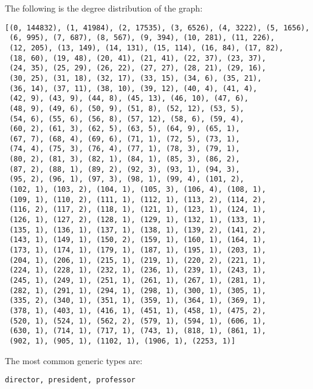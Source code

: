 \documentclass{tufte-handout}
\begin{document}
\begin{enumerate}
The following is the degree distribution of the graph:
\begin{verbatim}
[(0, 144832), (1, 41984), (2, 17535), (3, 6526), (4, 3222), (5, 1656),
 (6, 995), (7, 687), (8, 567), (9, 394), (10, 281), (11, 226),
 (12, 205), (13, 149), (14, 131), (15, 114), (16, 84), (17, 82),
 (18, 60), (19, 48), (20, 41), (21, 41), (22, 37), (23, 37),
 (24, 35), (25, 29), (26, 22), (27, 27), (28, 21), (29, 16),
 (30, 25), (31, 18), (32, 17), (33, 15), (34, 6), (35, 21),
 (36, 14), (37, 11), (38, 10), (39, 12), (40, 4), (41, 4),
 (42, 9), (43, 9), (44, 8), (45, 13), (46, 10), (47, 6),
 (48, 9), (49, 6), (50, 9), (51, 8), (52, 12), (53, 5),
 (54, 6), (55, 6), (56, 8), (57, 12), (58, 6), (59, 4),
 (60, 2), (61, 3), (62, 5), (63, 5), (64, 9), (65, 1),
 (67, 7), (68, 4), (69, 6), (71, 1), (72, 5), (73, 1),
 (74, 4), (75, 3), (76, 4), (77, 1), (78, 3), (79, 1),
 (80, 2), (81, 3), (82, 1), (84, 1), (85, 3), (86, 2),
 (87, 2), (88, 1), (89, 2), (92, 3), (93, 1), (94, 3),
 (95, 2), (96, 1), (97, 3), (98, 1), (99, 4), (101, 2),
 (102, 1), (103, 2), (104, 1), (105, 3), (106, 4), (108, 1),
 (109, 1), (110, 2), (111, 1), (112, 1), (113, 2), (114, 2),
 (116, 2), (117, 2), (118, 1), (121, 1), (123, 1), (124, 1),
 (126, 1), (127, 2), (128, 1), (129, 1), (132, 1), (133, 1),
 (135, 1), (136, 1), (137, 1), (138, 1), (139, 2), (141, 2),
 (143, 1), (149, 1), (150, 2), (159, 1), (160, 1), (164, 1),
 (173, 1), (174, 1), (179, 1), (187, 1), (195, 1), (203, 1),
 (204, 1), (206, 1), (215, 1), (219, 1), (220, 2), (221, 1),
 (224, 1), (228, 1), (232, 1), (236, 1), (239, 1), (243, 1),
 (245, 1), (249, 1), (251, 1), (261, 1), (267, 1), (281, 1),
 (282, 1), (291, 1), (294, 1), (298, 1), (300, 1), (305, 1),
 (335, 2), (340, 1), (351, 1), (359, 1), (364, 1), (369, 1),
 (378, 1), (403, 1), (416, 1), (451, 1), (458, 1), (475, 2),
 (520, 1), (524, 1), (562, 2), (579, 1), (594, 1), (606, 1),
 (630, 1), (714, 1), (717, 1), (743, 1), (818, 1), (861, 1),
 (902, 1), (905, 1), (1102, 1), (1906, 1), (2253, 1)]
\end{verbatim}

The most common generic types are:
\begin{verbatim}
director, president, professor
\end{verbatim}


\end{enumerate}
\end{document}
